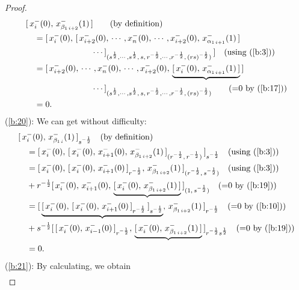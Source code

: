 \documentclass{amsproc}
\theoremstyle{remark}
\numberwithin{equation}{section}
\begin{document}
\begin{proof}
\begin{eqnarray*}
\begin{split}
&[\,x_i^-{(0)},\, x_{\beta_{1\,i+2}}^-(1)\,]
\qquad {\hbox{(by definition)}}\\
&\quad=[\,x_i^-(0),\,[\,x_{i+2}^-(0),\,\cdots,
x_{n}^-(0),\,\cdots,x_{i+2}^-(0),\,
x_{\alpha_{1\,i+1}}^-(1)\,]\\
&\quad\hskip2.4cm \cdots]_{(s^{\frac{1}{2}},\cdots,s^{\frac{1}{2}},\,s
,\,r^{-\frac{1}{2}},\cdots,r^{-\frac{1}{2}},\,(rs)^{-\frac{1}{2}})}
\,]\quad {\hbox{(using (\ref{b:3}))}}\\
&\quad=[\,x_{i+2}^-(0),\,\cdots, x_{n}^-(0),\,\cdots,x_{i+2}^-(0),\,
\underbrace{[\,x_i^-(0),\,x_{\alpha_{1\,i+1}}^-(1)\,]}
\,]\\
&\quad\hskip2.4cm \cdots]_{(s^{\frac{1}{2}},\cdots,s^{\frac{1}{2}},\,s
,\,r^{-\frac{1}{2}},\cdots,r^{-\frac{1}{2}},\,(rs)^{-\frac{1}{2}})}\qquad {\hbox{(=0 by (\ref{b:17}))}}\\
&\quad=0.
\end{split}
\end{eqnarray*}
(\ref{b:20}): We can get without difficulty:
\begin{eqnarray*}
\begin{split}
&[\,x_i^-{(0)},\, x_{\beta_{1\,i}}^-(1)\,]_{s^{-\frac{1}{2}}}
\quad {\hbox{(by definition)}}\\
&\quad=[\,x_i^-(0),\,[\,x_{i}^-(0),\,x_{i+1}^-(0),\,x_{\beta_{1\,i+2}}^-(1)
\,]_{(r^{-\frac{1}{2}},\,r^{-\frac{1}{2}})}\,]_{s^{-\frac{1}{2}}}
\quad {\hbox{(using (\ref{b:3}))}}\\
&\quad=[\,x_i^-(0),\,[\,x_{i}^-(0),\,x_{i+1}^-(0)\,]_{r^{-\frac{1}{2}}}
,\,x_{\beta_{1\,i+2}}^-(1)\,]_{(r^{-\frac{1}{2}},\,s^{-\frac{1}{2}})}
\quad {\hbox{(using (\ref{b:3}))}}\\
&\quad+r^{-\frac{1}{2}}[\,x_i^-(0),\,x_{i+1}^-(0),\,
\underbrace{[\,x_{i}^-(0),\,x_{\beta_{1\,i+2}}^-(1)\,]}
\,]_{(1,\,s^{-\frac{1}{2}})}\quad {\hbox{(=0 by (\ref{b:19}))}}\\
&\quad=[\,\underbrace{[\,x_i^-(0),\,[\,x_{i}^-(0),\,x_{i+1}^-(0)\,]_{r^{-\frac{1}{2}}}
\,]_{s^{-\frac{1}{2}}}}
,\,x_{\beta_{1\,i+2}}^-(1)\,]_{r^{-\frac{1}{2}}}\quad {\hbox{(=0 by (\ref{b:10}))}}\\
&\quad+s^{-\frac{1}{2}}[\,[\,x_{i}^-(0),\,x_{i-1}^-(0)\,]_{r^{-\frac{1}{2}}}
,\,\underbrace{[\,x_{i}^-(0),\,x_{\beta_{1\,i+2}}^-(1)\,]}
\,]_{r^{-\frac{1}{2}}s^{\frac{1}{2}}}\quad {\hbox{(=0 by (\ref{b:19}))}}\\
&\quad=0.
\end{split}
\end{eqnarray*}
(\ref{b:21}):  By calculating, we obtain
\begin{eqnarray*}

\end{eqnarray*}
\end{proof}
\end{document}
